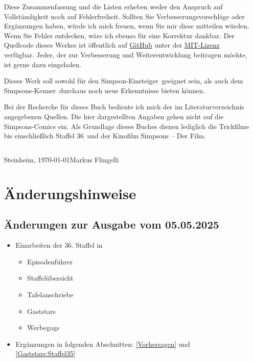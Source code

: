 \documentclass[pagesize,twoside,german]{scrbook}
\newcommand{\staffelAnzahl}{36}
\begin{document}
Diese Zusammenfassung und die Listen erheben weder den Anspruch auf Voll\-stän\-dig\-keit noch auf Fehlerfreiheit. Sollten Sie Verbesserungsvorschläge oder Er\-gänz\-un\-gen haben, würde ich mich freuen, wenn Sie mir diese mitteilen würden. Wenn Sie Fehler entdecken, wäre ich ebenso für eine Korrektur dankbar. Der Quellcode dieses Werkes ist öffentlich auf \href{https://github.com/mflingelli/simpsons}{GitHub} unter der \href{https://github.com/mflingelli/simpsons/blob/development/LICENSE.md}{MIT-Lizenz} verfügbar. Jeder, der zur Verbesserung und Weiterentwicklung beitragen möchte, ist gerne dazu eingeladen.

Dieses Werk soll sowohl für den \glqq Simpson-Einsteiger\grqq\ geeignet sein, als auch dem \glqq Simpsons-Kenner\grqq\ durchaus noch neue Erkenntnisse bieten können.

Bei der Recherche für dieses Buch bediente ich mich der im Literaturverzeichnis angegebenen Quellen. Die hier dargestellten Angaben gehen nicht auf die Simpsons-Comics ein. Als Grundlage dieses Buches dienen lediglich die Trickfilme bis einschließlich Staffel \staffelAnzahl\ und der Kinofilm \glqq Simpsons -- Der Film\grqq .

\subsection*{}
{
Steinheim, \today \hfill Markus Flingelli
}


\section*{Änderungshinweise}

\subsection*{Änderungen zur Ausgabe vom 05.05.2025}
\begin{itemize}
	\item Einarbeiten der 36. Staffel in
	\begin{itemize}
		\item Episodenführer
		\item Staffelübersicht
		\item Tafelanschriebe
		\item Gaststars
		\item Werbegags
	\end{itemize}
	\item Ergänzungen in folgenden Abschnitten: \ref{Vorhersagen} und \ref{Gaststars:Staffel35}
\end{itemize}
\end{document}
